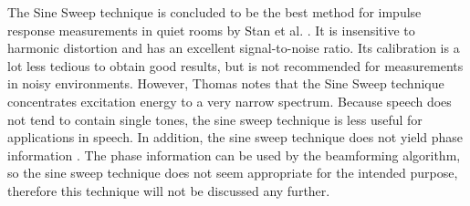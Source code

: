 The Sine Sweep technique is concluded to be the best method for impulse response measurements in quiet rooms by Stan et al. \cite{Stan2002249}.
It is insensitive to harmonic distortion and has an excellent signal-to-noise ratio.
Its calibration is a lot less tedious to obtain good results, but is not recommended for measurements in noisy environments.
However, Thomas \cite{Thomas2006} notes that the Sine Sweep technique concentrates excitation energy to a very narrow spectrum. Because speech does not tend to contain single tones, the sine sweep technique is less useful for applications in speech.
In addition, the sine sweep technique does not yield phase information \cite{Thomas2006}.
The phase information can be used by the beamforming algorithm, so the sine sweep technique does not seem appropriate for the intended purpose, therefore this technique will not be discussed any further. 

